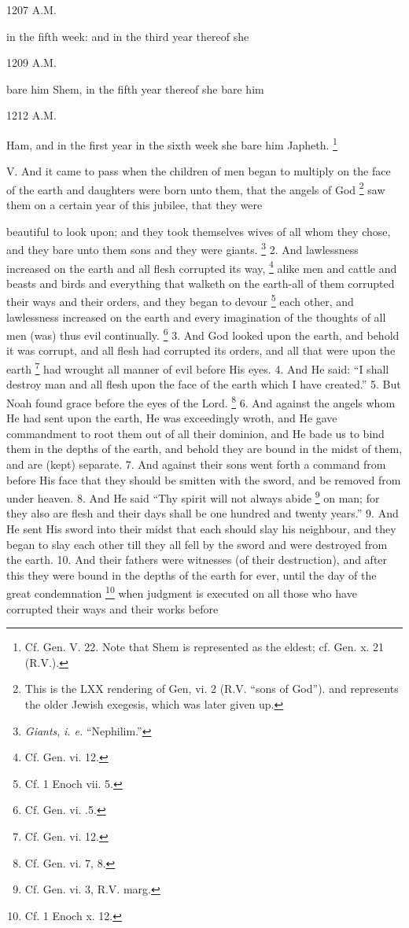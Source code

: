 1207 A.M.

in the fifth week: and in the third year thereof she

1209 A.M.

bare him Shem, in the fifth year thereof she bare him

1212 A.M.

Ham, and in the first year in the sixth week she bare him Japheth. \footnote{Cf. Gen. V. 22. Note that Shem is represented as the eldest; cf. Gen. x. 21 (R.V.).}


V. And it came to pass when the children of men began to multiply on the face of the earth and daughters were born unto them, that the angels of God \footnote{This is the LXX rendering of Gen, vi. 2 (R.V. ``sons of God''). and represents the older Jewish exegesis, which was later given up.} saw them on a certain year of this jubilee, that they were

beautiful to look upon; and they took themselves wives of all whom they chose, and they bare unto them sons and they were giants. \footnote{\emph{Giants}, \emph{i. e.} ``Nephilim.''} 2. And lawlessness increased on the earth and all flesh corrupted its way, \footnote{Cf. Gen. vi. 12.} alike men and cattle and beasts and birds and everything that walketh on the earth-all of them corrupted their ways and their orders, and they began to devour \footnote{Cf. 1 Enoch vii. 5.} each other, and lawlessness increased on the earth and every imagination of the thoughts of all men (was) thus evil continually. \footnote{Cf. Gen. vi. .5.} 3. And God looked upon the earth, and behold it was corrupt, and all flesh had corrupted its orders, and all that were upon the earth \footnote{Cf. Gen. vi. 12.} had wrought all manner of evil before His eyes. 4. And He said: ``I shall destroy man and all flesh upon the face of the earth which I have created.'' 5. But Noah found grace before the eyes of the Lord. \footnote{Cf. Gen. vi. 7, 8.} 6. And against the angels whom He had sent upon the earth, He was exceedingly wroth, and He gave commandment to root them out of all their dominion, and He bade us to bind them in the depths of the earth, and behold they are bound in the midst of them, and are (kept) separate. 7. And against their sons went forth a command from before His face that they should be smitten with the sword, and be removed from under heaven. 8. And He said ``Thy spirit will not always abide \footnote{Cf. Gen. vi. 3, R.V. marg.} on man; for they also are flesh and their days shall be one hundred and twenty years.'' 9. And He sent His sword into their midst that each should slay his neighbour, and they began to slay each other till they all fell by the sword and were destroyed from the earth. 10. And their fathers were witnesses (of their destruction), and after this they were bound in the depths of the earth for ever, until the day of the great condemnation \footnote{Cf. 1 Enoch x. 12.} when judgment is executed on all those who have corrupted their ways and their works before

